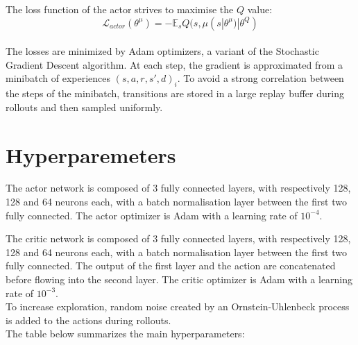 \documentclass{article}
\begin{document}
    The loss function of the actor strives to maximise the $Q$ value:
    \[
        \mathcal{L}_{actor}(\theta^{\mu}) = - \mathbb{E}_{s} Q(s, \mu(s | \theta^\mu) | \theta^Q)
    \]\\

    The losses are minimized by Adam optimizers, a variant of the Stochastic Gradient Descent algorithm.
    At each step, the gradient is approximated from a minibatch of experiences ${(s, a, r, s', d)_i}$.
    To avoid a strong correlation between the steps of the minibatch, transitions are stored in a large replay buffer
    during rollouts and then sampled uniformly.


    \section{Hyperparemeters}\label{sec:hyperparemeters}

    The actor network is composed of 3 fully connected layers, with respectively 128, 128 and 64 neurons each,
    with a batch normalisation layer between the first two fully connected.
    The actor optimizer is Adam with a learning rate of $10^{-4}$.

    The critic network is composed of 3 fully connected layers, with respectively 128, 128 and 64 neurons each,
    with a batch normalisation layer between the first two fully connected.
    The output of the first layer and the action are concatenated before flowing into the second layer.
    The critic optimizer is Adam with a learning rate of $10^{-3}$.\\

    To increase exploration, random noise created by an Ornstein-Uhlenbeck process is added to the actions during rollouts.\\

    The table below summarizes the main hyperparameters:
\end{document}
